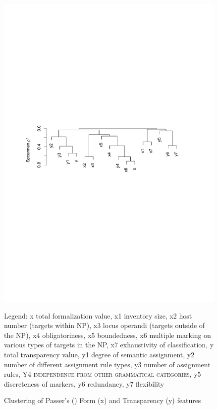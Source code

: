 \documentclass[output=collectionpaper]{langsci/langscibook}
\begin{document}
\begin{figure}
\caption{Clustering of Passer's (\citealt*{Passer2016b}) Form (x) and Transparency (y) features}
\includegraphics[width=\textwidth]{figures/14/fig4}
\begin{flushleft}
  \small Legend: x total formalization value, x1 inventory size, x2 host number (targets within NP), x3 locus operandi (targets outside of the NP), x4 obligatoriness, x5 boundedness, x6 multiple marking on various types of targets in the NP, x7 exhaustivity of classification, y total transparency value, y1 degree of semantic assignment, y2 number of different assignment rule types, y3 number of assignment rules, Y4 \textsc{independence from other grammatical categories}, y5 discreteness of markers, y6 redundancy, y7 flexibility
\end{flushleft}%
\label{fig:WDG:4}
\end{figure}
\end{document}
